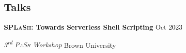 \documentclass[margin,12pt]{resume}
\newcommand{\descriptionVSpace}{\vspace{0.5ex}\xspace}
\newcommand{\subsectionVSpace}{\vspace{3.5ex}\xspace}
\newcommand{\sectionVSpace}{\vspace{1ex}\xspace} %
\newcommand{\pash}{\textsc{PaSh}\xspace}
\newcommand{\sectionVSpaceCorrection}{\vspace{-3.5ex}} %
\newcommand{\splash}{\textsc{SPLaSh}\xspace}
\newcommand{\header}[1]{\textbf{#1}\xspace}
\newcommand{\competition}[1]{\header{#1}\xspace}
\newcommand{\event}[1]{\textit{#1}\xspace}
\newcommand{\interval}[2]{#1 --- #2\xspace}
\newcommand{\ordinal}[1]{\textsuperscript{#1}\xspace}
\newcommand{\place}[1]{#1\xspace}
\newcommand{\project}[2]{\header{\href{#2}{#1}}}
\newcommand{\singleDate}[1]{#1\xspace}
\newcommand{\talk}[1]{\header{#1}\xspace}
\newenvironment{rSubsection}{}{\par\subsectionVSpace}
\newenvironment{rSection}[1]{\sectionVSpaceCorrection\section{#1}\xspace}{\sectionVSpace\par}
\newenvironment{jobDuties}{\descriptionVSpace}{\par}
\newenvironment{projectDescription}{\descriptionVSpace}{\par}
\begin{document}
\begin{resume}
\begin{rSection}{Talks}

        \begin{rSubsection}
            \talk{\splash: Towards Serverless Shell Scripting} \hfill \singleDate{Oct 2023}

            \event{3\ordinal{rd} \pash Workshop} \hfill \place{Brown University}
        \end{rSubsection}
    \end{rSection}








\end{resume}
\end{document}
